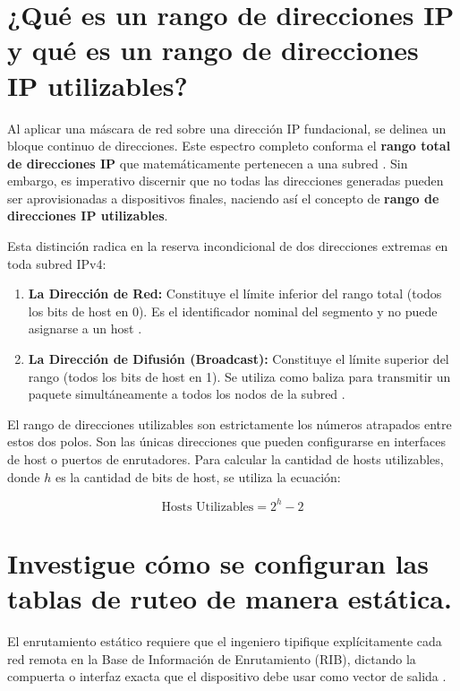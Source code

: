 \documentclass[a4paper,12pt]{article}
\begin{document}
\newpage

\section{¿Qué es un rango de direcciones IP y qué es un rango de direcciones IP utilizables?}

Al aplicar una máscara de red sobre una dirección IP fundacional, se delinea un bloque continuo de direcciones. Este espectro completo conforma el \textbf{rango total de direcciones IP} que matemáticamente pertenecen a una subred \cite{quia_ranges}. Sin embargo, es imperativo discernir que no todas las direcciones generadas pueden ser aprovisionadas a dispositivos finales, naciendo así el concepto de \textbf{rango de direcciones IP utilizables}.

Esta distinción radica en la reserva incondicional de dos direcciones extremas en toda subred IPv4:
\begin{enumerate}
    \item \textbf{La Dirección de Red:} Constituye el límite inferior del rango total (todos los bits de host en 0). Es el identificador nominal del segmento y no puede asignarse a un host \cite{quia_ranges}.
    \item \textbf{La Dirección de Difusión (Broadcast):} Constituye el límite superior del rango (todos los bits de host en 1). Se utiliza como baliza para transmitir un paquete simultáneamente a todos los nodos de la subred \cite{quia_ranges}.
\end{enumerate}

El rango de direcciones utilizables son estrictamente los números atrapados entre estos dos polos. Son las únicas direcciones que pueden configurarse en interfaces de host o puertos de enrutadores. Para calcular la cantidad de hosts utilizables, donde $h$ es la cantidad de bits de host, se utiliza la ecuación:

\[
\text{Hosts Utilizables} = 2^h - 2
\]

\newpage

\section{Investigue cómo se configuran las tablas de ruteo de manera estática.}

El enrutamiento estático requiere que el ingeniero tipifique explícitamente cada red remota en la Base de Información de Enrutamiento (RIB), dictando la compuerta o interfaz exacta que el dispositivo debe usar como vector de salida \cite{ccnadesdecero_static}. 
\end{document}
